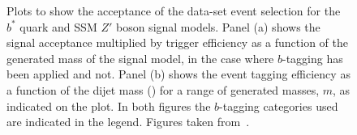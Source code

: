 \begin{figure}[!htb]
  \begin{center}
    \captionsetup[subfigure]{aboveskip=0pt,justification=centering}
  \end{center}
  \vspace{-1em}
  \caption[Plots to show the acceptance of the \summer{} data-set event selection for the $b^*$ quark and SSM $Z'$ boson signal models.]
          {Plots to show the acceptance of the \summer{} data-set event selection for the $b^*$ quark and SSM $Z'$ boson signal models.
            Panel (a) shows the signal acceptance multiplied by trigger efficiency as a
            function of the generated mass of the signal model, in the case where $b$-tagging has been applied and not.
            Panel (b) shows the event tagging efficiency as a function of the dijet mass (\mjj{})
            for a range of generated masses, $m$, as indicated on the plot.
            In both figures the $b$-tagging categories used are indicated in the legend.
            Figures taken from~\cite{dibjet-ichep_conf}.} 
  \label{fig:evt-ichep_acc}
\end{figure}

